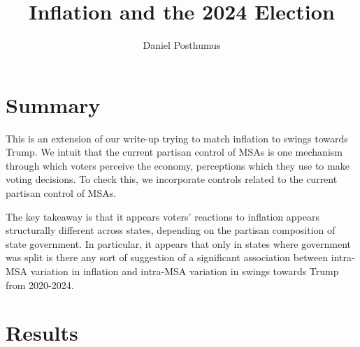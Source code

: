 \documentclass{article}
\title{Inflation and the 2024 Election}
\author{Daniel Posthumus}
\begin{document}
\maketitle 

\section{Summary}

This is an extension of our write-up trying to match inflation to swings towards Trump. We intuit that the current partisan control of MSAs is one mechanism through which voters perceive the economy, perceptions which they use to make voting decisions. To check this, we incorporate controls related to the current partisan control of MSAs. 

The key takeaway is that it appears voters' reactions to inflation appears structurally different across states, depending on the partisan composition of state government. In particular, it appears that only in states where government was split is there any sort of suggestion of a significant association between intra-MSA variation in inflation and intra-MSA variation in swings towards Trump from 2020-2024.

\section{Results}
\end{document}
